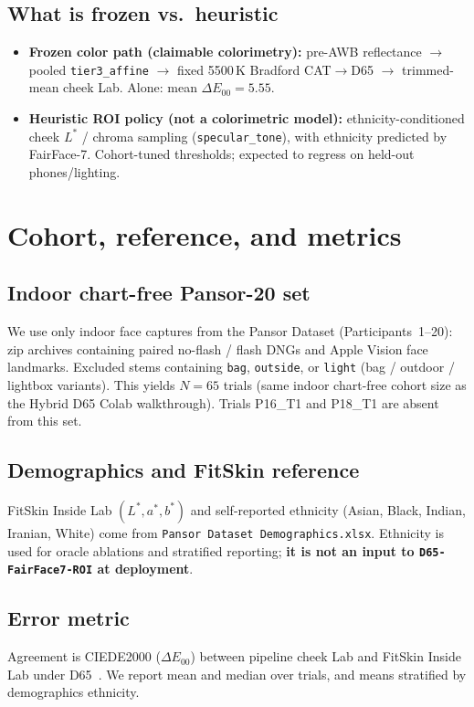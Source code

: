 \documentclass[11pt]{article}
\newcommand{\deee}{\ensuremath{\Delta E_{00}}}
\newcommand{\pipename}{\texttt{D65-FairFace7-ROI}}
\begin{document}
\subsection{What is frozen vs.\ heuristic}
\begin{itemize}[leftmargin=*]
  \item \textbf{Frozen color path (claimable colorimetry):}
    pre-AWB reflectance $\to$ pooled \texttt{tier3\_affine} $\to$ fixed 5500\,K Bradford CAT$\to$D65 $\to$ trimmed-mean cheek Lab.
    Alone: mean $\deee=\num{5.55}$.
  \item \textbf{Heuristic ROI policy (not a colorimetric model):}
    ethnicity-conditioned cheek $L^*$ / chroma sampling (\texttt{specular\_tone}), with ethnicity predicted by FairFace-7.
    Cohort-tuned thresholds; expected to regress on held-out phones/lighting.
\end{itemize}

\section{Cohort, reference, and metrics}

\subsection{Indoor chart-free Pansor-20 set}
We use only indoor face captures from the Pansor Dataset (Participants~1--20): zip archives containing paired no-flash / flash DNGs and Apple Vision face landmarks.
Excluded stems containing \texttt{bag}, \texttt{outside}, or \texttt{light} (bag / outdoor / lightbox variants).
This yields $N=65$ trials (same indoor chart-free cohort size as the Hybrid D65 Colab walkthrough).
Trials P16\_T1 and P18\_T1 are absent from this set.

\subsection{Demographics and FitSkin reference}
FitSkin Inside Lab $(L^*,a^*,b^*)$ and self-reported ethnicity (Asian, Black, Indian, Iranian, White) come from \texttt{Pansor Dataset Demographics.xlsx}.
Ethnicity is used for oracle ablations and stratified reporting; \textbf{it is not an input to \pipename{} at deployment}.

\subsection{Error metric}
Agreement is CIEDE2000 ($\deee$) between pipeline cheek Lab and FitSkin Inside Lab under D65~\cite{sharma2005ciede2000}.
We report mean and median over trials, and means stratified by demographics ethnicity.
\end{document}
